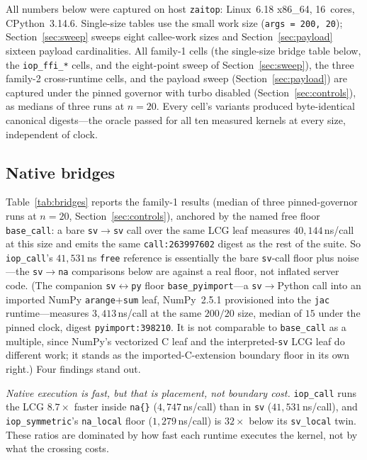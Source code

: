 \documentclass[conference]{IEEEtran}
\newcommand{\code}[1]{\texttt{#1}}
\begin{document}
All numbers below were captured on host \code{zaitop}: Linux~6.18 x86\_64,
16~cores, CPython~3.14.6. Single-size tables use the small work size
(\code{args = 200, 20}); Section~\ref{sec:sweep} sweeps eight callee-work sizes
and Section~\ref{sec:payload} sixteen payload cardinalities. All family-1 cells
(the single-size bridge table below, the \code{iop\_ffi\_*} cells, and the
eight-point sweep of Section~\ref{sec:sweep}), the three family-2 cross-runtime
cells, and the payload sweep (Section~\ref{sec:payload}) are captured under
the pinned governor with turbo disabled (Section~\ref{sec:controls}), as medians
of three runs at $n{=}20$. Every cell's variants produced byte-identical
canonical digests---the oracle passed for all ten measured kernels at every size,
independent of clock.

\subsection{Native bridges}

Table~\ref{tab:bridges} reports the family-1 results (median of three
pinned-governor runs at $n{=}20$, Section~\ref{sec:controls}), anchored by the
named free floor \code{base\_call}: a bare \code{sv$\rightarrow$sv} call over the
same LCG leaf measures $40{,}144$\,ns/call at this size and emits the same
\code{call:263997602} digest as the rest of the suite. So \code{iop\_call}'s
$41{,}531$\,ns \code{free} reference is essentially the bare \code{sv}-call floor
plus noise---the \code{sv$\rightarrow$na} comparisons below are against a real
floor, not inflated server code. (The companion \code{sv$\leftrightarrow$py}
floor \code{base\_pyimport}---a \code{sv}$\rightarrow$Python call into an imported
NumPy \code{arange}+\code{sum} leaf, NumPy~2.5.1 provisioned into the \code{jac}
runtime---measures $3{,}413$\,ns/call at the same $200/20$ size, median of $15$
under the pinned clock, digest \code{pyimport:398210}. It is not comparable to
\code{base\_call} as a multiple, since NumPy's vectorized C leaf and the
interpreted-\code{sv} LCG leaf do different work; it stands as the imported-C-extension
boundary floor in its own right.) Four findings stand out.

\emph{Native execution is fast, but that is placement, not boundary cost.}
\code{iop\_call} runs the LCG $8.7\times$ faster inside \code{na\{\}}
($4{,}747$\,ns/call) than in \code{sv} ($41{,}531$\,ns/call), and
\code{iop\_symmetric}'s \code{na\_local} floor ($1{,}279$\,ns/call) is $32\times$
below its \code{sv\_local} twin. These ratios are dominated by how fast each
runtime executes the kernel, not by what the crossing costs.
\end{document}
